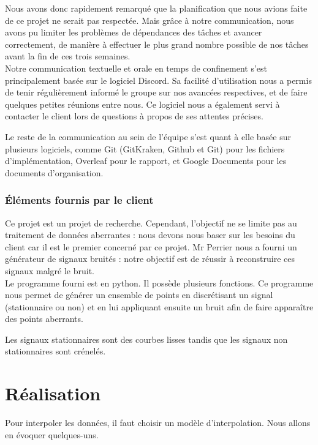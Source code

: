 \documentclass[a4paper,12pt]{article} %
\begin{document}
        Nous avons donc rapidement remarqué que la planification que nous avions faite de ce projet ne serait pas respectée. Mais grâce à notre communication, nous avons pu limiter les problèmes de dépendances des tâches et avancer correctement, de manière à effectuer le plus grand nombre possible de nos tâches avant la fin de ces trois semaines.\\
        
        Notre communication textuelle et orale en temps de confinement s'est principalement basée sur le logiciel Discord. Sa facilité d'utilisation nous a permis de tenir régulièrement informé le groupe sur nos avancées respectives, et de faire quelques petites réunions entre nous. Ce logiciel nous a également servi à contacter le client lors de questions à propos de ses attentes précises.
        
        Le reste de la communication au sein de l'équipe s'est quant à elle basée sur plusieurs logiciels, comme Git (GitKraken, Github et Git) pour les fichiers d'implémentation, Overleaf pour le rapport, et Google Documents pour les documents d'organisation.
        
	\section{Éléments fournis par le client}
	    Ce projet est un projet de recherche. Cependant, l'objectif ne se limite pas au traitement de données aberrantes : nous devons nous baser sur les besoins du client car il est le premier concerné par ce projet. Mr Perrier nous a fourni un générateur de signaux bruités : notre objectif est de réussir à reconstruire ces signaux malgré le bruit. \\
	    
	    Le programme fourni est en python. Il possède plusieurs fonctions. Ce programme nous permet de générer un ensemble de points en discrétisant un signal (stationnaire  ou non) et en lui appliquant ensuite un bruit afin de faire apparaître des points aberrants.
	    
	    Les signaux stationnaires sont des courbes lisses tandis que les signaux non stationnaires sont crénelés. 



\renewcommand\partname{}
\part{Réalisation}
	Pour interpoler les données, il faut choisir un modèle d'interpolation. Nous allons en évoquer quelques-uns. 
	
\end{document}
